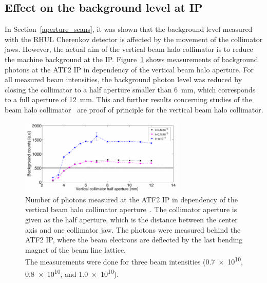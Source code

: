 \subsection{Effect on the background level at IP}
\label{collimator_bkg_IP}
In Section~\ref{aperture_scans}, it was shown that the background level measured with the RHUL Cherenkov detector is affected by the movement of the collimator jaws.
However, the actual aim of the vertical beam halo collimator is to reduce the machine background at the IP.
Figure~\ref{fig:IP_background} shows measurements of background photons at the ATF2 IP in dependency of the vertical beam halo aperture.
For all measured beam intensities, the background photon level was reduced by closing the collimator to a half aperture smaller than \SI{6}{\milli\meter}, which corresponds to a full aperture of \SI{12}{\milli\meter}.
This and further results concerning studies of the beam halo collimator~\cite{Nuria_Thesis} are proof of principle for the vertical beam halo collimator.
\begin{figure}[!h]
\centering
\includegraphics[width=0.7\textwidth]{Figures/ATF/IP_background_Nuria_Thesis_p212.pdf}
\caption[Number of background particles at the ATF2 IP]{Number of photons measured at the ATF2 IP in dependency of the vertical beam halo collimator aperture~\cite[p. 212]{Nuria_Thesis}.
The collimator aperture is given as the half aperture, which is the distance between the center axis and one collimator jaw.
The photons were measured behind the ATF2 IP, where the beam electrons are deflected by the last bending magnet of the beam line lattice.
\\The measurements were done for three beam intensities (\num[detect-all]{0.7e10}, \num[detect-all]{0.8e10}, and \num[detect-all]{1.0e10}).}
\label{fig:IP_background}
\end{figure}